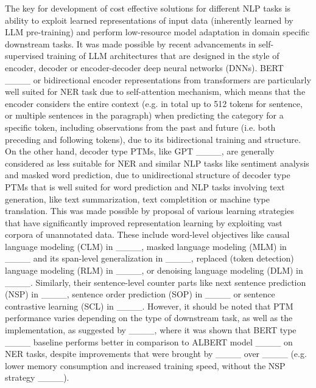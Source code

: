 The key for development of cost effective solutions for different NLP tasks is ability to exploit learned representations of input data (inherently learned by LLM pre-training) and perform low-resource model adaptation in domain specific downstream tasks. It was made possible by recent advancements in self-supervised training of LLM architectures that are designed in the style of encoder, decoder or encoder-decoder deep neural networks (DNNs). BERT ____ or bidirectional encoder representations from transformers are particularly well suited for NER task due to self-attention mechanism, which means that the encoder considers the entire context (e.g. in total up to 512 tokens for sentence, or multiple sentences in the paragraph) when predicting the category for a specific token, including observations from the past and future (i.e. both preceding and following tokens), due to its bidirectional training and structure. On the other hand, decoder type PTMs, like GPT ____, are generally considered as less suitable for NER and similar NLP tasks like sentiment analysis and masked word prediction,  due to unidirectional structure of decoder type PTMs that is well suited for word prediction and NLP tasks involving text generation, like text summarization, text completition or machine type translation. This was made possible by proposal of various learning strategies that have significantly improved representation learning by exploiting vast corpora of unannotated data. These include word-level objectives like causal language modeling (CLM) in ____, masked language modeling (MLM) in ____ and  its span-level generalization in ____, replaced (token detection) language modeling (RLM) in ____, or denoising language modeling (DLM) in ____. Similarly, their sentence-level counter parts like next sentence prediction (NSP) in ____, sentence order prediction (SOP) in ____ or sentence contrastive learning (SCL) in ____. However, it should be noted that PTM performance varies depending on the type of downstream task, as well as the implementation, as suggested by ____, where it was shown that BERT type ____ baseline performs better in comparison to ALBERT model ____ on NER tasks, despite improvements that were brought by ____ over ____ (e.g. lower memory consumption and increased training speed, without the NSP strategy ____).

